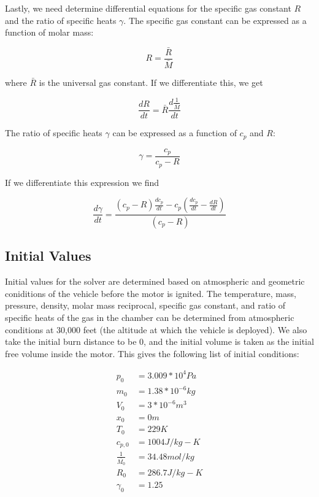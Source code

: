 \documentclass[12pt, letterpaper]{article}
\begin{document}
Lastly, we need determine differential equations for the specific gas constant $R$ and the ratio of specific heats $\gamma$. The specific gas constant can be expressed as a function of molar mass:

\begin{equation}
  R = \frac{\bar{R}}{\bar{M}}
\end{equation}

where $\bar{R}$ is the universal gas constant. If we differentiate this, we get

\begin{equation}
  \frac{dR}{dt} = \bar{R} \frac{d \frac{1}{\bar{M}}}{dt}
\end{equation}

The ratio of specific heats $\gamma$ can be expressed as a function of $c_p$ and $R$:

\begin{equation}
  \gamma = \frac{c_p}{c_p - R}
\end{equation}

If we differentiate this expression we find

\begin{equation}
  \frac{d \gamma}{dt} = \frac{ \left( c_p - R \right) \frac{d c_p}{dt} - c_p \left( \frac{d c_p}{dt} - \frac{dR}{dt} \right)}{\left( c_p - R \right)}
\end{equation}

\subsection{Initial Values}

Initial values for the solver are determined based on atmospheric and geometric coniditions of the vehicle before the motor is ignited. The temperature, mass, pressure, density, molar mass reciprocal, specific gas constant, and ratio of specific heats of the gas in the chamber can be determined from atmospheric conditions at 30,000 feet (the altitude at which the vehicle is deployed). We also take the initial burn distance to be 0, and the initial volume is taken as the initial free volume inside the motor. This gives the following list of initial conditions:

\begin{align*}
  p_0 &= 3.009 * 10^4 Pa \\
  m_0 &= 1.38 * 10^{-6} kg \\
  V_0 &= 3 * 10^{-6} m^3 \\
  x_0 &= 0 m \\
  T_0 &= 229 K \\
  c_{p,0} &= 1004 J/kg-K \\
  \frac{1}{\bar{M_0}} &= 34.48 mol/kg \\
  R_0 &= 286.7 J/kg-K \\
  \gamma_0 &= 1.25
\end{align*}
\end{document}
